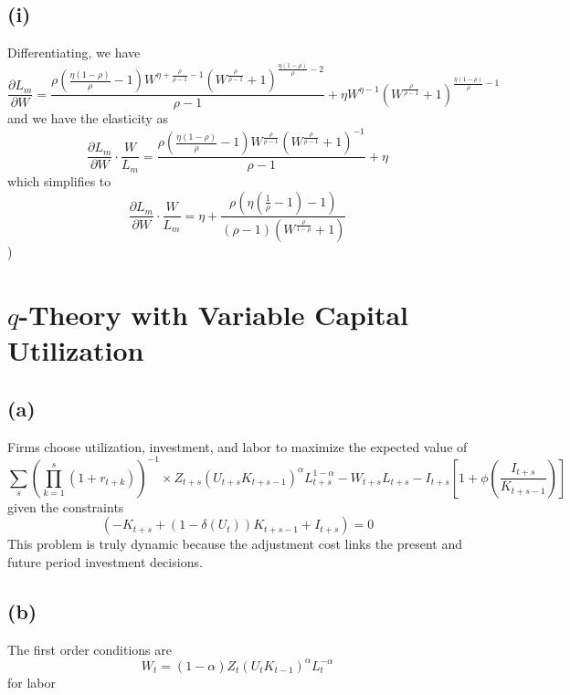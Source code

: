 \documentclass[11pt]{amsart}
\begin{document}
\subsection*{(i)}

Differentiating, we have
\[
\frac{\partial L_m}{\partial W} = \frac{\rho  \left(\frac{\eta  (1-\rho )}{\rho }-1\right) W^{\eta +\frac{\rho }{\rho -1}-1} \left(W^{\frac{\rho }{\rho -1}}+1\right)^{\frac{\eta  (1-\rho )}{\rho }-2}}{\rho -1}+\eta  W^{\eta -1} \left(W^{\frac{\rho }{\rho -1}}+1\right)^{\frac{\eta  (1-\rho )}{\rho }-1}
\]
and we have the elasticity as
\[
\frac{\partial L_m}{\partial W} \cdot \frac{W}{ L_m} = \frac{\rho  \left(\frac{\eta  (1-\rho )}{\rho }-1\right) W^{\frac{\rho }{\rho -1}} \left(W^{\frac{\rho }{\rho -1}}+1\right)^{-1}}{\rho -1} + \eta 
\]
which simplifies to 
\[
\frac{\partial L_m}{\partial W} \cdot \frac{W}{ L_m} =  \eta +\frac{\rho  \left(\eta  \left(\frac{1}{\rho }-1\right)-1\right)}{(\rho -1) \left(W^{\frac{\rho }{1-\rho }}+1\right)}
\]
)
\section{$q$-Theory with Variable Capital Utilization}

\subsection*{(a)}

Firms choose utilization, investment, and labor to maximize the expected value of 
\[
\sum_{s} \left( \prod_{k=1}^{s} \left(1 + r_{t+k} \right) \right)^{-1} 
\times   Z_{t+s} \left( U_{t+s} K_{t+s-1}  \right)^{\alpha} L_{t+s}^{1-\alpha}  - W_{t+s} L_{t+s} - I_{t+s} \left[ 1 + \phi \left( \frac{I_{t+s}}{K_{t+s-1}} \right) \right] 
\]
given the constraints
\[
\left( -K_{t+s} + (1-\delta(U_t))K_{t+s-1} + I_{t+s} \right) = 0
\]
This problem is truly dynamic because the adjustment cost links the present and future period investment decisions. 

\subsection*{(b)}
The first order conditions are
\[
W_t =(1-\alpha)  Z_{t} \left( U_{t} K_{t-1}  \right)^{\alpha} L_{t}^{-\alpha}
\]
for labor
\end{document}
